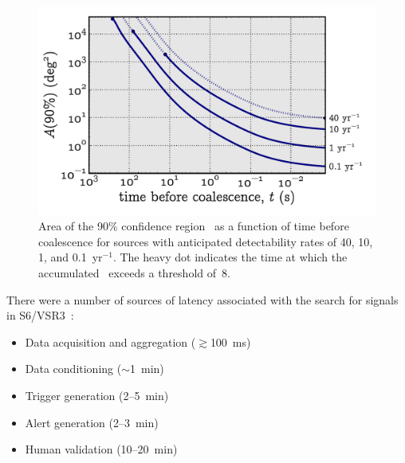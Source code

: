 \documentclass[portrait,plainboxedsections]{sciposter}
\begin{document}
\begin{minipage}[t]{0.25\textwidth}
\begin{figure}[h]
\includegraphics[width=1.15\textwidth]{figures/loc_in_time}
\caption{\label{fig:sky-localization-accuracy}Area of the 90\% confidence
region~\citep{Fairhurst2009} as a function of time before coalescence for sources with anticipated
detectability rates of 40, 10, 1, and 0.1~yr$^{-1}$. The heavy dot indicates
the time at which the accumulated \SNR\ exceeds a threshold of~8.}
\end{figure}

There were a number of sources of latency associated with the search for
\CBC{} signals in S6/VSR3~\citep{HugheyGWPAW2011}:

\begin{itemize}
\item Data acquisition and aggregation ($\gtrsim$100~ms)

\item Data conditioning ($\sim$1~min)

\item Trigger generation (2--5~min)

\item Alert generation (2--3~min)

\item Human validation (10--20~min)

\end{itemize}

\end{minipage}%
\hspace{0.05\textwidth}%
\end{document}
